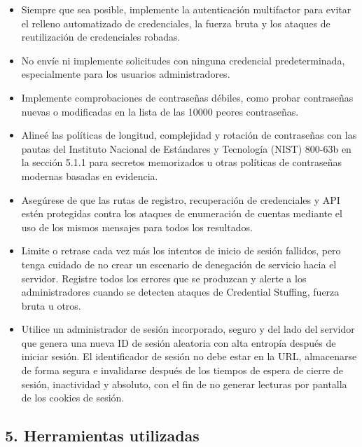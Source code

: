 \documentclass[12pt,oneside,a4paper]{book}
\newcommand{\newsection}[1]{{\subsection*{#1}
\addcontentsline{toc}{section}{#1}}}
\begin{document}
\begin{enumerate}
\begin{enumerate}
        \begin{itemize}
            \item Siempre que sea posible, implemente la autenticación multifactor para evitar el relleno automatizado de credenciales, la fuerza bruta y los ataques de reutilización de credenciales robadas.
            \item No envíe ni implemente solicitudes con ninguna credencial predeterminada, especialmente para los usuarios administradores.
            \item Implemente comprobaciones de contraseñas débiles, como probar contraseñas nuevas o modificadas en la lista de las 10000 peores contraseñas.
            \item Alineé las políticas de longitud, complejidad y rotación de contraseñas con las pautas del Instituto Nacional de Estándares y Tecnología (NIST) 800-63b en la sección 5.1.1 para secretos memorizados u otras políticas de contraseñas modernas basadas en evidencia.
            \item Asegúrese de que las rutas de registro, recuperación de credenciales y API estén protegidas contra los ataques de enumeración de cuentas mediante el uso de los mismos mensajes para todos los resultados.
            \item Limite o retrase cada vez más los intentos de inicio de sesión fallidos, pero tenga cuidado de no crear un escenario de denegación de servicio hacia el servidor. Registre todos los errores que se produzcan y alerte a los administradores cuando se detecten ataques de Credential Stuffing, fuerza bruta u otros.
            \item Utilice un administrador de sesión incorporado, seguro y del lado del servidor que genera una nueva ID de sesión aleatoria con alta entropía después de iniciar sesión. El identificador de sesión no debe estar en la URL, almacenarse de forma segura e invalidarse después de los tiempos de espera de cierre de sesión, inactividad y absoluto, con el fin de no generar lecturas por pantalla de los cookies de sesión.
        \end{itemize}

    \end{enumerate}
\end{enumerate}

\newpage





\newsection{5. Herramientas utilizadas}
\end{document}
